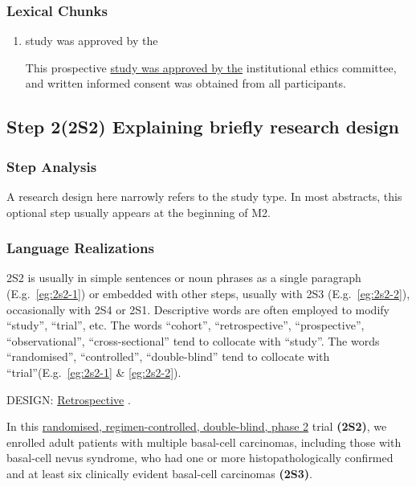 \documentclass{ctexbook}
\begin{document}
    \subsubsection{Lexical Chunks}

    \begin{enumerate}
      \item study was approved by the
      \begin{eg}
        This prospective \uline{study was approved by the} institutional ethics committee, and written informed consent was obtained from all participants.
      \end{eg}
    \end{enumerate}

  \subsection{Step 2(2S2) Explaining briefly research design}

    \subsubsection{Step Analysis}

    A research design here narrowly refers to the study type. In most abstracts, this optional step usually appears at the beginning of M2.

    \subsubsection{Language Realizations}

    2S2 is usually in simple sentences or noun phrases as a single paragraph (E.g.~\ref{eg:2s2-1}) or embedded with other steps, usually with 2S3 (E.g.~\ref{eg:2s2-2}), occasionally with 2S4 or 2S1. Descriptive words are often employed to modify ``study'', ``trial'', etc. The words ``cohort'', ``retrospective'', ``prospective'', ``observational'', ``cross-sectional'' tend to collocate with ``study''. The words ``randomised'', ``controlled'', ``double-blind'' tend to collocate with ``trial''(E.g.~\ref{eg:2s2-1} \& \ref{eg:2s2-2}).

    \begin{eg}[label={eg:2s2-1}]{}
      DESIGN: \uline{Retrospective} .
    \end{eg}

    \begin{eg}[label={eg:2s2-2}]{}
      In this \uline{randomised, regimen-controlled, double-blind, phase 2} trial \textbf{(2S2)}, we enrolled adult patients with multiple basal-cell carcinomas, including those with basal-cell nevus syndrome, who had one or more histopathologically confirmed and at least six clinically evident basal-cell carcinomas \textbf{(2S3)}.
    \end{eg}
\end{document}
